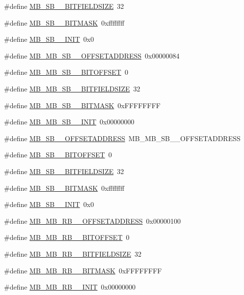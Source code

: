 \begin{DoxyCompactItemize}
\item 
\#define \hyperlink{a00562_aaec7d6f877389ed3b70fb6ee5a07a5e5}{MB\_\-SB\_\_\-BITFIELDSIZE}~32
\item 
\#define \hyperlink{a00562_a5dc722f16108621d17c15ad979f571aa}{MB\_\-SB\_\_\-BITMASK}~0xffffffff
\item 
\#define \hyperlink{a00562_ac6db6e00bb0cae0815327c336c6db3e4}{MB\_\-SB\_\_\-INIT}~0x0
\item 
\#define \hyperlink{a00562_a82c49e5e657b719dfd114c72f27ebd30}{MB\_\-MB\_\-SB\_\_\-OFFSETADDRESS}~0x00000084
\item 
\#define \hyperlink{a00562_a4b5f15c244f60225e71245897544e510}{MB\_\-MB\_\-SB\_\_\-BITOFFSET}~0
\item 
\#define \hyperlink{a00562_a7f58d22bc6bd935cdcebfd551e41276a}{MB\_\-MB\_\-SB\_\_\-BITFIELDSIZE}~32
\item 
\#define \hyperlink{a00562_a3e049ae85217296243804dcc0087ee56}{MB\_\-MB\_\-SB\_\_\-BITMASK}~0xFFFFFFFF
\item 
\#define \hyperlink{a00562_ab825c64ca597307580f667d0280e7492}{MB\_\-MB\_\-SB\_\_\-INIT}~0x00000000
\item 
\#define \hyperlink{a00562_ac4e4557bc1f3997c608aee00bf6163a6}{MB\_\-SB\_\_\-OFFSETADDRESS}~MB\_\-MB\_\-SB\_\_\-OFFSETADDRESS
\item 
\#define \hyperlink{a00562_a08c188e8443baaa53b5488a99913ae27}{MB\_\-SB\_\_\-BITOFFSET}~0
\item 
\#define \hyperlink{a00562_aadecf9282a8add55469fbb0594203756}{MB\_\-SB\_\_\-BITFIELDSIZE}~32
\item 
\#define \hyperlink{a00562_ab338d9ab36dfe47604d126a8b85d2c46}{MB\_\-SB\_\_\-BITMASK}~0xffffffff
\item 
\#define \hyperlink{a00562_abf9a1c23cf38a70fed0c12823a44f337}{MB\_\-SB\_\_\-INIT}~0x0
\item 
\#define \hyperlink{a00562_a610b968a7a2c9b04ba6211adbf2c38d5}{MB\_\-MB\_\-RB\_\_\-OFFSETADDRESS}~0x00000100
\item 
\#define \hyperlink{a00562_afa518a22ef88aaa5f2ccfad75ee57ae7}{MB\_\-MB\_\-RB\_\_\-BITOFFSET}~0
\item 
\#define \hyperlink{a00562_a186495a4e987fa9cf41de20f3d91c75d}{MB\_\-MB\_\-RB\_\_\-BITFIELDSIZE}~32
\item 
\#define \hyperlink{a00562_a3652fc00ec77ef172c0588a0d7bd577b}{MB\_\-MB\_\-RB\_\_\-BITMASK}~0xFFFFFFFF
\item 
\#define \hyperlink{a00562_a2214f99c9af4d1d530aded3478cf16ed}{MB\_\-MB\_\-RB\_\_\-INIT}~0x00000000

\end{DoxyCompactItemize}
